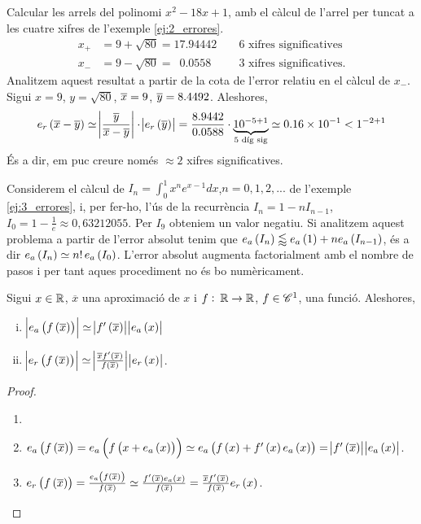 \begin{example}
	Calcular les arrels del polinomi  $x^2 - 18x + 1$, amb el càlcul de l'arrel per tuncat a les cuatre xifres de l'exemple \ref{ej:2_errores}.
	\begin{align*}
		x_+ &= 9 + \sqrt{80} = 17.94442 &&\text{ 6 xifres significatives} \\
		x_- &= 9 - \sqrt{80} = \enspace 0.0558 &&\text{ 3 xifres significatives}.
	\end{align*}
	Analitzem aquest resultat a partir de la cota de l'error relatiu en el càlcul de $x_-$. Sigui $x = 9$, $y = \sqrt{80}$, $\overline{x}=9$, $\overline{y}=8.4492$. Aleshores,
	\[
		e_r\left( \overline{x}-\overline{y}\right)  \simeq \abs{\frac{\overline{y}}{\overline{x}-\overline{y}}}\cdot\abs{e_r\left( \overline{y}\right)} = \dfrac{8.9442}{0.0588}\cdot \underbrace{10^{-5+1}}_{\text{5 díg sig}} \simeq \SI{0.16e-1}{} < 1^{-2+1}
	\]
	És a dir, em puc creure només $\approx 2$ xifres significatives.
\end{example}

\begin{example}
  Considerem el càlcul de $I_n = \int_{0}^{1}x^ne^{x-1}dx$,$n = 0,1,2,...$ de l'exemple  \ref{ej:3_errores}, i, per fer-ho, l'ús de la recurrència $I_n = 1 - nI_{n-1}$, $I_0 = 1 - \frac{1}{e} \approx 0,63212055$. Per $I_9$ obteniem un valor negatiu. Si analitzem aquest problema a partir de l'error absolut tenim que $e_a\left( I_n\right)  \lessapprox e_a\left( 1\right)  + ne_a\left( I_{n-1}\right) $, és a dir $e_a\left( I_n\right)  \simeq n!\,e_a\left( I_0\right) $. L'error absolut augmenta factorialment amb el nombre de pasos i per tant aques procediment no és bo numèricament.
\end{example}

\begin{prop}\label{prop:1_error_funcion}
  Sigui $x \in \mathbb{R}$, $\overline{x}$ una aproximació de $x$ i $f:\: \mathbb{R} \to \mathbb{R}$, $f\in \mathscr{C}^1$, una funció. Aleshores,
  \begin{enumerate}[i)]
   \item $\abs{e_a\left( f\left(\overline{x}\right)\right)} \simeq \abs{f'\left( \overline{x}\right)}\abs{e_a\left( x\right)}$
   \item $\abs{e_r\left( f\left(\overline{x}\right)\right)} \simeq \abs{\frac{\overline{x}f'\left(\overline{x}\right)}{f\left(\overline{x}\right)}}\abs{e_r\left( x\right)}$.
  \end{enumerate}
\end{prop}
\begin{proof}
  \begin{enumerate}
   \item []
   \item 
      $e_a\left( f\left( \overline{x}\right)\right)  = e_a\left( f\left( x + e_a\left( x\right) \right)\right) \simeq e_a\left( f\left( x\right)  + f'\left( x\right) e_a\left( x\right)\right) = \abs{f'\left( \overline{x}\right)}\abs{e_a\left( x\right)}$.
   \item 
      $e_r\left( f\left( \overline{x}\right) \right)  = \frac{e_a\left( f\left( \overline{x}\right) \right) }{f\left( \overline{x}\right) } \simeq \frac{f'\left( \overline{x}\right) e_a\left( x\right) }{f\left( \overline{x}\right) } = \frac{\overline{x}f'\left( \overline{x}\right) }{f\left( \overline{x}\right) }e_r\left( x\right)$.
  \end{enumerate}
\end{proof}

